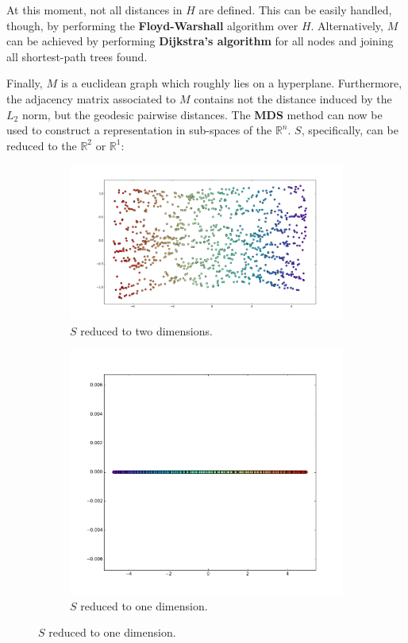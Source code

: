 \documentclass[12pt]{article}
\begin{document}
At this moment, not all distances in $H$ are defined. This can be easily handled, though, by performing the \textbf{Floyd-Warshall} algorithm over $H$. Alternatively, $M$ can be achieved by performing \textbf{Dijkstra's algorithm} for all nodes and joining all shortest-path trees found.

Finally, $M$ is a euclidean graph which roughly lies on a hyperplane. Furthermore, the adjacency matrix associated to $M$ contains not the distance induced by the $L_2$ norm, but the geodesic pairwise distances. \cite{gho2006} The \textbf{MDS} method can now be used to construct a representation in sub-spaces of the $\mathbb{R}^n$. $S$, specifically, can be reduced to the $\mathbb{R}^2$ or $\mathbb{R}^1$:

\begin{figure}[H]
    \begin{subfigure}{.5\linewidth}
		\centering
		\captionsetup{justification=centering}
		\includegraphics[width=\linewidth]{mani_s_4}
		\caption{$S$ reduced to two dimensions.}
		\label{fig:mani_s_reduced_1}
	\end{subfigure}%
	\begin{subfigure}{.5\linewidth}
		\centering
		\captionsetup{justification=centering}
		\includegraphics[width=.63\linewidth]{mani_s_5}
		\caption{$S$ reduced to one dimension.}
		\label{fig:mani_s_reduced_2}
	\end{subfigure}
\end{figure}
\end{document}
